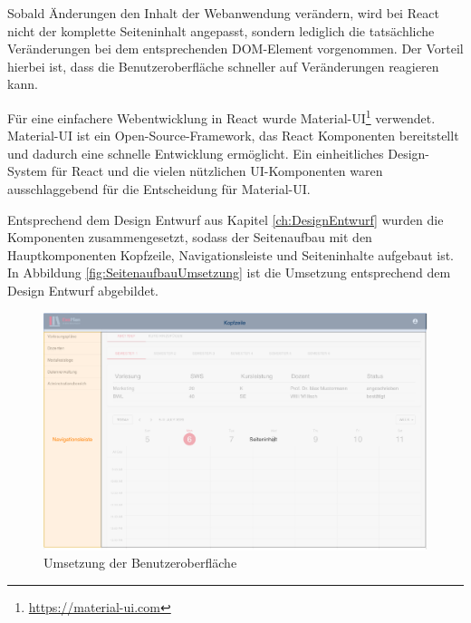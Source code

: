%

Sobald Änderungen den Inhalt der Webanwendung verändern, wird bei React nicht der komplette Seiteninhalt angepasst, sondern lediglich die tatsächliche Veränderungen bei dem entsprechenden \ac{DOM}-Element vorgenommen. 
Der Vorteil hierbei ist, dass die Benutzeroberfläche schneller auf Veränderungen reagieren kann. 

Für eine einfachere Webentwicklung in React wurde Material-UI\footnote{\url{https://material-ui.com}} verwendet. 
Material-UI ist ein Open-Source-Framework, das React Komponenten bereitstellt und dadurch eine schnelle Entwicklung ermöglicht.
Ein einheitliches Design-System für React und die vielen nützlichen UI-Komponenten waren ausschlaggebend für die Entscheidung für Material-UI.

Entsprechend dem Design Entwurf aus Kapitel \vref{ch:DesignEntwurf} wurden die Komponenten zusammengesetzt, sodass der Seitenaufbau mit den Hauptkomponenten Kopfzeile, Navigationsleiste und Seiteninhalte aufgebaut ist. In Abbildung \vref{fig:SeitenaufbauUmsetzung} ist die Umsetzung entsprechend dem Design Entwurf abgebildet.

\begin{figure}[h]
	\centering 
	\includegraphics[width=\textwidth]{img/FrontEnd/UmsetzungDesign.pdf}
	\captionsetup{format=hang}
	\caption[Umsetzung der Benutzeroberfläche]{\label{fig:SeitenaufbauUmsetzung}Umsetzung der Benutzeroberfläche}
\end{figure}



